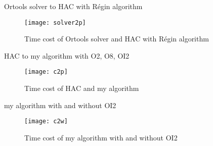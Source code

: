 \documentclass[10pt,aspectratio=43,mathserif]{beamer}
\begin{document}
        \begin{frame}{Ortools solver to HAC with Régin algorithm}
            \begin{figure}[H]
            \centering
            \texttt{[image: solver2p]}
            \caption{Time cost of Ortools solver and HAC with Régin algorithm}
            \end{figure}
        \end{frame}
        \begin{frame}{HAC to my algorithm with O2, O8, OI2}
            \begin{figure}[H]
            \centering
            \texttt{[image: c2p]}
            \caption{Time cost of HAC and my algorithm}
            \end{figure}
        \end{frame}
        \begin{frame}{my algorithm with and without OI2}
            \begin{figure}[H]
            \centering
            \texttt{[image: c2w]}
            \caption{Time cost of my algorithm with and without OI2}
            \end{figure}
        \end{frame}
{}

\end{document}
